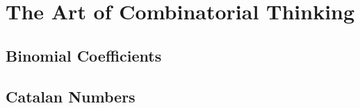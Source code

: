 \chapter{The Art of Combinatorial Thinking}



\section{Binomial Coefficients}



\section{Catalan Numbers}



\endinput